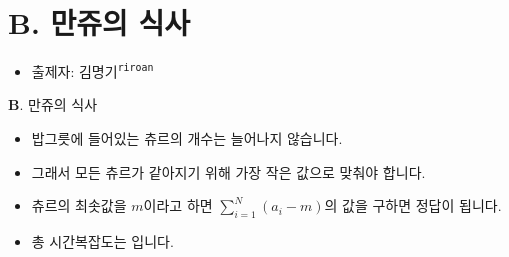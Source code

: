 \section{B. 만쥬의 식사}

\begin{frame} %
    \begin{itemize}
        \item 출제자: 김명기\textsuperscript{\color{kupc-gray}\texttt{riroan}}
    \end{itemize}
\end{frame}

\begin{frame}{\textbf{B}. 만쥬의 식사}
    \begin{itemize}
        \item 밥그릇에 들어있는 츄르의 개수는 늘어나지 않습니다.
        \item 그래서 모든 츄르가 같아지기 위해 가장 작은 값으로 맞춰야 합니다.
        \item 츄르의 최솟값을 $m$이라고 하면 $\sum_{i=1}^N (a_i - m)$의 값을 구하면 정답이 됩니다.
		\item 총 시간복잡도는 입니다.
    \end{itemize}
\end{frame}